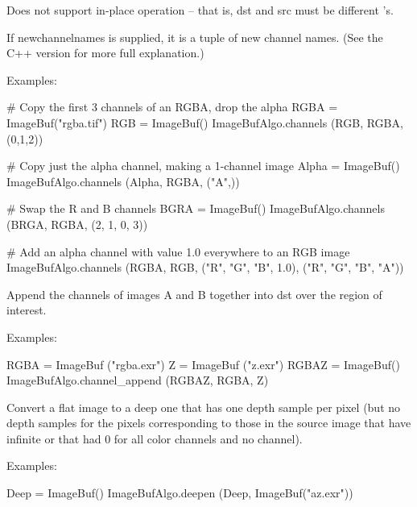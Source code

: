 Does not support in-place operation -- that is, {\cf dst} and {\cf src} must
be different \ImageBuf's.

If {\cf newchannelnames} is supplied, it is a tuple of new channel
names. (See the C++ version for more full explanation.)

\smallskip
\noindent Examples:
\begin{code}
    # Copy the first 3 channels of an RGBA, drop the alpha
    RGBA = ImageBuf("rgba.tif")
    RGB = ImageBuf()
    ImageBufAlgo.channels (RGB, RGBA, (0,1,2))

    # Copy just the alpha channel, making a 1-channel image
    Alpha = ImageBuf()
    ImageBufAlgo.channels (Alpha, RGBA, ("A",))

    # Swap the R and B channels
    BGRA = ImageBuf()
    ImageBufAlgo.channels (BRGA, RGBA, (2, 1, 0, 3))

    # Add an alpha channel with value 1.0 everywhere to an RGB image
    ImageBufAlgo.channels (RGBA, RGB, ("R", "G", "B", 1.0),
                            ("R", "G", "B", "A"))
\end{code}
\apiend


 
Append the channels of images {\cf A} and {\cf B} together into {\cf dst} over
the region of interest.

\smallskip
\noindent Examples:
\begin{code}
    RGBA = ImageBuf ("rgba.exr")
    Z = ImageBuf ("z.exr")
    RGBAZ = ImageBuf()
    ImageBufAlgo.channel_append (RGBAZ, RGBA, Z)
\end{code}
\apiend


  

Convert a flat image to a deep one that has one depth sample per pixel
(but no depth samples for the pixels corresponding to those in the source
image that have infinite  or that had 0 for all color channels and no
 channel).

\smallskip
\noindent Examples:
\begin{code}
    Deep = ImageBuf()
    ImageBufAlgo.deepen (Deep, ImageBuf("az.exr"))
\end{code}
\apiend


  

